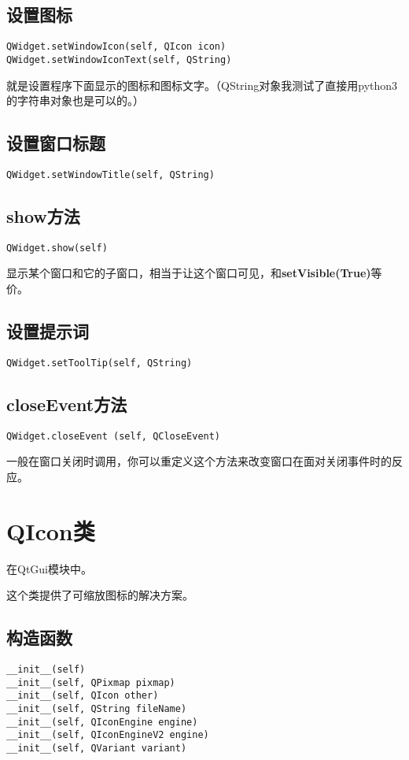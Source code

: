 \documentclass[12pt,oneside]{book}
\begin{document}
\begin{common-format}
\subsection{设置图标}
\begin{Verbatim}
QWidget.setWindowIcon(self, QIcon icon)
QWidget.setWindowIconText(self, QString)
\end{Verbatim}
就是设置程序下面显示的图标和图标文字。（QString对象我测试了直接用python3的字符串对象也是可以的。）


\subsection{设置窗口标题}
\begin{Verbatim}
QWidget.setWindowTitle(self, QString)
\end{Verbatim}


\subsection{show方法}
\begin{Verbatim}
QWidget.show(self)
\end{Verbatim}
显示某个窗口和它的子窗口，相当于让这个窗口可见，和\textbf{setVisible(True)}等价。

\subsection{设置提示词}
\begin{Verbatim}
QWidget.setToolTip(self, QString)
\end{Verbatim}

\subsection{closeEvent方法}
\begin{Verbatim}
QWidget.closeEvent (self, QCloseEvent)
\end{Verbatim}
一般在窗口关闭时调用，你可以重定义这个方法来改变窗口在面对关闭事件时的反应。



\section{QIcon类}
在QtGui模块中。

这个类提供了可缩放图标的解决方案。

\subsection{构造函数}
\begin{Verbatim}
__init__(self)
__init__(self, QPixmap pixmap)
__init__(self, QIcon other)
__init__(self, QString fileName)
__init__(self, QIconEngine engine)
__init__(self, QIconEngineV2 engine)
__init__(self, QVariant variant)
\end{Verbatim}


\end{common-format}
\end{document}
